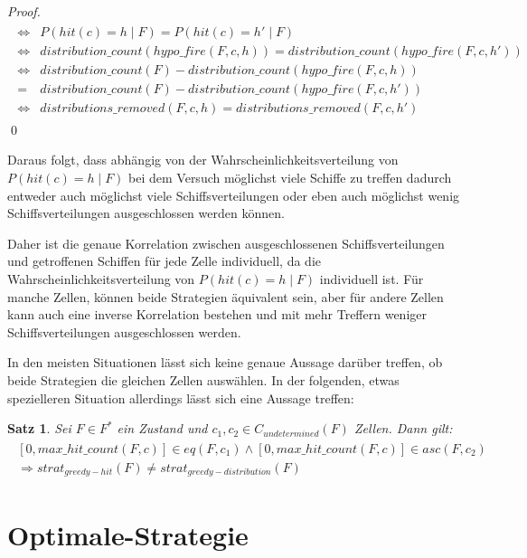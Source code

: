 \documentclass[a4paper,12pt]{llncs}
\numberwithin{equation}{section}
\newtheorem{satz}{Satz}
\begin{document}
\begin{proof}
\begin{align}
\begin{split}
\Leftrightarrow &P(hit(c)=h \mid F) = P(hit(c)=h' \mid F) \\
\Leftrightarrow &distribution\_count(hypo\_fire(F,c, h)) = distribution\_count(hypo\_fire(F,c, h')) \\
\Leftrightarrow &distribution\_count(F) - distribution\_count(hypo\_fire(F,c, h)) \\
= &distribution\_count(F) - distribution\_count(hypo\_fire(F,c, h')) \\
\Leftrightarrow &distributions\_removed(F,c, h) = distributions\_removed(F,c, h')
\nonumber
\end{split}
\end{align}
\qed
\end{proof}

Daraus folgt, dass abhängig von der Wahrscheinlichkeitsverteilung von $P(hit(c)=h \mid F)$ bei dem Versuch möglichst viele Schiffe zu treffen dadurch entweder auch möglichst viele Schiffsverteilungen oder eben auch möglichst wenig Schiffsverteilungen ausgeschlossen werden können.

Daher ist die genaue Korrelation zwischen ausgeschlossenen Schiffsverteilungen und getroffenen Schiffen für jede Zelle individuell, da die Wahrscheinlichkeitsverteilung von $P(hit(c)=h \mid F)$ individuell ist. Für manche Zellen, können beide Strategien äquivalent sein, aber für andere Zellen kann auch eine inverse Korrelation bestehen und mit mehr Treffern weniger Schiffsverteilungen ausgeschlossen werden.

In den meisten Situationen lässt sich keine genaue Aussage darüber treffen, ob beide Strategien die gleichen Zellen auswählen. In der folgenden, etwas spezielleren Situation allerdings lässt sich eine Aussage treffen:

\begin{satz}
Sei $F\in F^*$ ein Zustand und $c_1, c_2 \in C_{undetermined}(F)$ Zellen.
Dann gilt:
\begin{align}
\begin{split}
[0,max\_hit\_count(F, c)] \in eq(F, c_1) \wedge [0,max\_hit\_count(F, c)] \in asc(F, c_2)\\
\Rightarrow strat_{greedy-hit}(F) \neq strat_{greedy-distribution}(F)
\end{split}
\end{align}


\end{satz}


\section{Optimale-Strategie}
\end{document}

